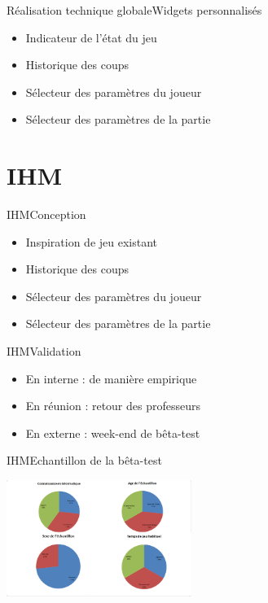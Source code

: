 \documentclass{beamer}
\begin{document}
\begin{frame}{Réalisation technique globale}{Widgets personnalisés}
 \begin{itemize}
  \item Indicateur de l'état du jeu
	\item Historique des coups
	\item Sélecteur des paramètres du joueur
	\item Sélecteur des paramètres de la partie
 \end{itemize}
\end{frame}

\section{IHM}

\begin{frame}{IHM}{Conception}
 \begin{itemize}
  \item Inspiration de jeu existant
	\item Historique des coups
	\item Sélecteur des paramètres du joueur
	\item Sélecteur des paramètres de la partie
 \end{itemize}
\end{frame}

\begin{frame}{IHM}{Validation}
 \begin{itemize}
  \item En interne : de manière empirique
	\item En réunion : retour des professeurs
	\item En externe : week-end de bêta-test
 \end{itemize}
\end{frame}

\begin{frame}{IHM}{Echantillon de la bêta-test}
 \begin{center}
\includegraphics[width=6cm]{echantillon.jpg}
\end{center}
\end{frame}
\end{document}
